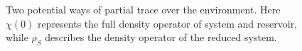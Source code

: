 %
%
\begin{figure}
\caption{Two potential ways of partial trace over the environment. Here $\chi(0)$ represents the full density operator of system and reservoir, while $\rho_{S}$ describes the density operator of the reduced system.}
\label{Fig:CPTP}
\end{figure}
%
